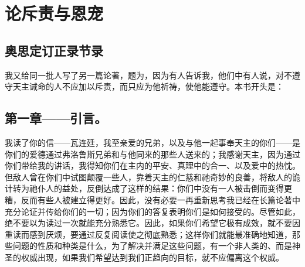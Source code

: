 
\chapter{论斥责与恩宠}


\par

\par


\section{奥思定订正录节录}

\par

我又给同一批人写了另一篇论著，题为，因为有人告诉我，他们中有人说，对不遵守天主诫命的人不应加以斥责，而只应为他祈祷，使他能遵守。本书开头是：\par


\section{第一章——引言。}

我读了你的信——瓦连廷，我至亲爱的兄弟，以及与他一起事奉天主的你们——是你们的爱德通过弗洛鲁斯兄弟和与他同来的那些人送来的；我感谢天主，因为通过你们带给我的讲话，我得知你们在主内的平安、真理中的合一、以及爱中的热忱。但敌人曾在你们中试图颠覆一些人，靠着天主的仁慈和祂奇妙的良善，将敌人的诡计转为祂仆人的益处，反倒达成了这样的结果：你们中没有一人被击倒而变得更糟，反而有些人被建立得更好。因此，没有必要一再重新思考我已经在长篇论著中充分论证并传给你们的一切；因为你们的答复表明你们是如何接受的。尽管如此，绝不要以为读过一次就能充分熟悉它。因此，如果你们希望它极有成效，就不要因重读而感到厌烦，要通过反复阅读使之彻底熟悉；这样你们就能最准确地知道，那些问题的性质和种类是什么，为了解决并满足这些问题，有一个非人类的、而是神圣的权威出现，如果我们希望达到我们正趋向的目标，就不应偏离这个权威。\par

